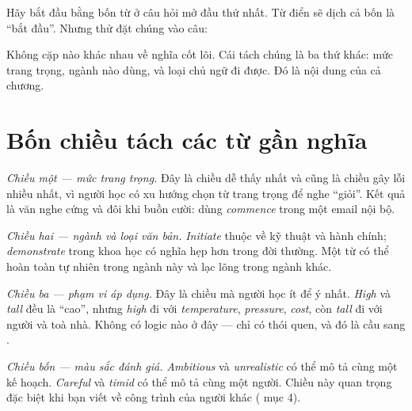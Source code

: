 \documentclass[../../english.tex]{subfiles}
\begin{document}
Hãy bắt đầu bằng bốn từ ở câu hỏi mở đầu thứ nhất. Từ điển sẽ dịch cả bốn là ``bắt đầu''. Nhưng thử đặt chúng vào câu:

\begin{tuvung}
\end{tuvung}

Không cặp nào khác nhau về nghĩa cốt lõi. Cái tách chúng là ba thứ khác: mức trang trọng, ngành nào dùng, và loại chủ ngữ đi được. Đó là nội dung của cả chương.

\section{Bốn chiều tách các từ gần nghĩa}

\emph{Chiều một --- mức trang trọng.} Đây là chiều dễ thấy nhất và cũng là chiều gây lỗi nhiều nhất, vì người học có xu hướng chọn từ trang trọng để nghe ``giỏi''. Kết quả là văn nghe cứng và đôi khi buồn cười: dùng \emph{commence} trong một email nội bộ.

\emph{Chiều hai --- ngành và loại văn bản.} \emph{Initiate} thuộc về kỹ thuật và hành chính; \emph{demonstrate} trong khoa học có nghĩa hẹp hơn trong đời thường. Một từ có thể hoàn toàn tự nhiên trong ngành này và lạc lõng trong ngành khác.

\emph{Chiều ba --- phạm vi áp dụng.} Đây là chiều mà người học ít để ý nhất. \emph{High} và \emph{tall} đều là ``cao'', nhưng \emph{high} đi với \emph{temperature}, \emph{pressure}, \emph{cost}, còn \emph{tall} đi với người và toà nhà. Không có logic nào ở đây --- chỉ có thói quen, và đó là cầu sang .

\emph{Chiều bốn --- màu sắc đánh giá.} \emph{Ambitious} và \emph{unrealistic} có thể mô tả cùng một kế hoạch. \emph{Careful} và \emph{timid} có thể mô tả cùng một người. Chiều này quan trọng đặc biệt khi bạn viết về công trình của người khác ( mục 4).
\end{document}
